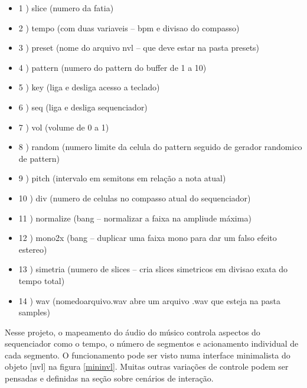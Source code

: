 \documentclass{ppgmus}
\begin{document}
\begin{itemize}
\item 1 ) slice (numero da fatia) 
\item 2 ) tempo (com duas variaveis – bpm e divisao do compasso)
\item 3 ) preset (nome do arquivo nvl – que deve estar na pasta presets)
\item 4 ) pattern (numero do pattern do buffer de 1 a 10)
\item 5 ) key (liga e desliga acesso a teclado)
\item 6 ) seq (liga e desliga sequenciador)
\item 7 ) vol (volume de 0 a 1)
\item 8 ) random (numero limite da celula do pattern seguido de gerador randomico de pattern)
\item 9 ) pitch (intervalo em semitons em relação a nota atual)
\item 10 ) div (numero de celulas no compasso atual do sequenciador)
\item 11 ) normalize (bang – normalizar a faixa na ampliude máxima)
\item 12 ) mono2x (bang – duplicar uma faixa mono para dar um falso efeito estereo)
\item 13 ) simetria (numero de slices – cria slices simetricos em divisao exata do tempo total)
\item 14 ) wav (nomedoarquivo.wav abre um arquivo .wav que esteja na pasta samples)
\end{itemize}


Nesse projeto, o mapeamento do áudio do músico controla aspectos do sequenciador como o tempo,
o número de segmentos e acionamento individual de cada segmento. O funcionamento
pode ser visto numa interface minimalista do objeto [nvl] na figura \ref{mininvl}.
Muitas outras variações de controle podem
ser pensadas e definidas na seção sobre cenários de interação.






% 
% 
% 
% 
% 
% 
% 
% 
% 
% 
\end{document}
